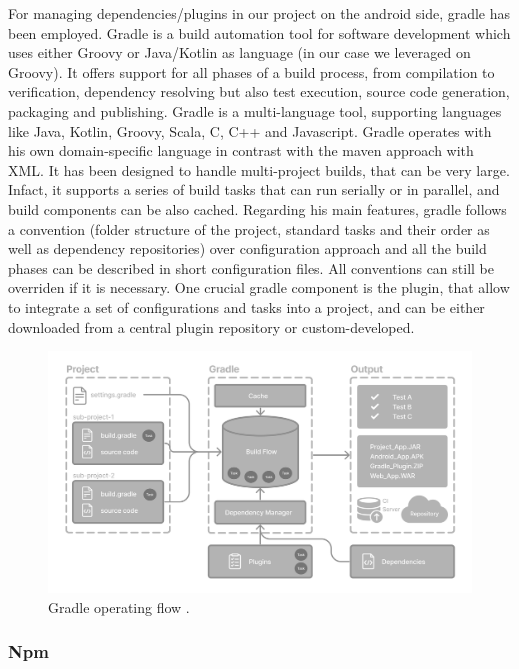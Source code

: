 For managing dependencies/plugins in our project on the android side, gradle has been employed. Gradle is a build automation tool for software development which uses either Groovy or Java/Kotlin as language (in our case we leveraged on Groovy). It offers support for all phases of a build process, from compilation to verification, dependency resolving but also test execution, source code generation, packaging and publishing. Gradle is a multi-language tool, supporting languages like Java, Kotlin, Groovy, Scala, C, C++ and Javascript. Gradle operates with his own domain-specific language in contrast with the maven approach with XML. It has been designed to handle multi-project builds, that can be very large. Infact, it supports a series of build tasks that can run serially or in parallel, and build components can be also cached. Regarding his main features, gradle follows a convention (folder structure of the project, standard tasks and their order as well as dependency repositories) over configuration approach and all the build phases can be described in short configuration files. All conventions can still be overriden if it is necessary. One crucial gradle component is the plugin, that allow to integrate a set of configurations and tasks into a project, and can be either downloaded from a central plugin repository or custom-developed\cite{Gradle}.

\begin{figure}
    \includegraphics[width=1.0\linewidth]{./images/gradle_basics.png}
    \caption[Gradle operating flow.]{Gradle operating flow \protect\cite{GradleBasics}.}
    \label{fig:gradleBasics}
\end{figure}

\subsubsection{Npm}

